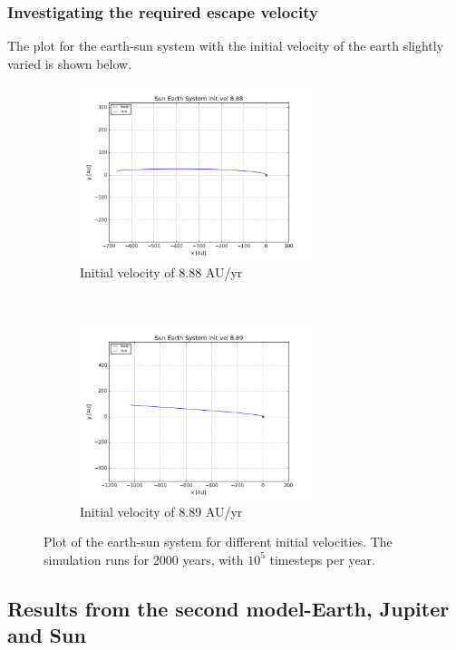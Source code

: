 \documentclass[a4paper, 10pt]{article}
\begin{document}
\subsubsection{Investigating the required escape velocity}
The plot for the earth-sun system with the initial velocity of the earth slightly varied is shown below.
\begin{figure}[!ht]
    \centering
    \begin{subfigure}[H!]{0.5\textwidth}
        \centering
        \includegraphics[height=2.0in]{escape888.png}
        \caption{Initial velocity of 8.88 AU/yr}
    \end{subfigure}%
    ~ 
    \begin{subfigure}[H!]{0.5\textwidth}
        \centering
        \includegraphics[height=2.0in]{escape889.png}
        \caption{Initial velocity of 8.89 AU/yr}
    \end{subfigure}
    \caption{Plot of the earth-sun system for different initial velocities. The simulation runs for 2000 years, with $10^5$ timesteps per year.}\label{fig:escape_vel}
\end{figure}
\newpage
\subsection{Results from the second model-Earth, Jupiter and Sun}
\end{document}
